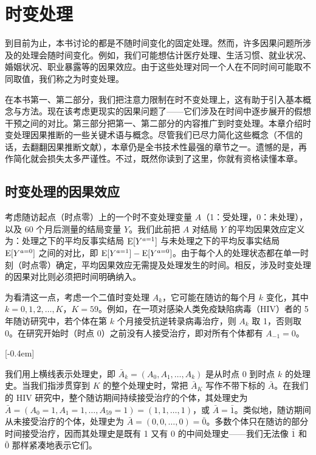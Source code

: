 \chapter[\hspace{0.6em}时变处理]{时变处理}

\providecommand{\mnotev}[2]{\marginnote{\textcolor{black!85}{#2}}[#1]}

到目前为止，本书讨论的都是不随时间变化的固定处理。然而，许多因果问题所涉及的处理会随时间变化。例如，我们可能想估计医疗处理、生活习惯、就业状况、婚姻状况、职业暴露等的因果效应。由于这些处理对同一个人在不同时间可能取不同取值，我们称之为时变处理。

在本书第一、第二部分，我们把注意力限制在时不变处理上，这有助于引入基本概念与方法。现在该考虑更现实的因果问题了——它们涉及在时间中逐步展开的假想干预之间的对比。第三部分把第一、第二部分的内容推广到时变处理。本章介绍时变处理因果推断的一些关键术语与概念。尽管我们已尽力简化这些概念（不信的话，去翻翻因果推断文献），本章仍是全书技术性最强的章节之一。遗憾的是，再作简化就会损失太多严谨性。不过，既然你读到了这里，你就有资格读懂本章。

\section{时变处理的因果效应}

考虑随访起点（时点零）上的一个时不变处理变量 $A$（1：受处理，0：未处理），以及 60 个月后测量的结局变量 $Y$。我们此前把 $A$ 对结局 $Y$ 的平均因果效应定义为：处理之下的平均反事实结局 $\mathrm{E}[Y^{a=1}]$ 与未处理之下的平均反事实结局 $\mathrm{E}[Y^{a=0}]$ 之间的对比，即 $\mathrm{E}[Y^{a=1}]-\mathrm{E}[Y^{a=0}]$。由于每个人的处理状态都在单一时刻（时点零）确定，平均因果效应无需提及处理发生的时间。相反，涉及时变处理的因果对比则必须把时间明确纳入。

为看清这一点，考虑一个二值时变处理 $A_k$，它可能在随访的每个月 $k$ 变化，其中 $k=0,1,2,\ldots,K$，$K=59$。例如，在一项对感染人类免疫缺陷病毒（HIV）者的 5 年随访研究中，若个体在第 $k$ 个月接受抗逆转录病毒治疗，则 $A_k$ 取 1，否则取 0。在研究开始时（时点 0）之前没有人接受治疗，即对所有个体都有 $A_{-1}=0$。

\mnotev{-0.4em}{为简单起见，我们暂时假定此期间没有人失访，并假定所有变量都被完美测量。}

我们用上横线表示处理史，即 $\bar{A}_k=(A_0,A_1,\ldots,A_k)$ 是从时点 0 到时点 $k$ 的处理史。当我们指涉贯穿到 $K$ 的整个处理史时，常把 $\bar{A}_K$ 写作不带下标的 $\bar{A}$。在我们的 HIV 研究中，整个随访期间持续接受治疗的个体，其处理史为 $\bar{A}=(A_0=1,A_1=1,\ldots,A_{59}=1)=(1,1,\ldots,1)$，或 $\bar{A}=\bar{1}$。类似地，随访期间从未接受治疗的个体，处理史为 $\bar{A}=(0,0,\ldots,0)=\bar{0}$。多数个体只在随访的部分时间接受治疗，因而其处理史是既有 1 又有 0 的中间处理史——我们无法像 $\bar{1}$ 和 $\bar{0}$ 那样紧凑地表示它们。

